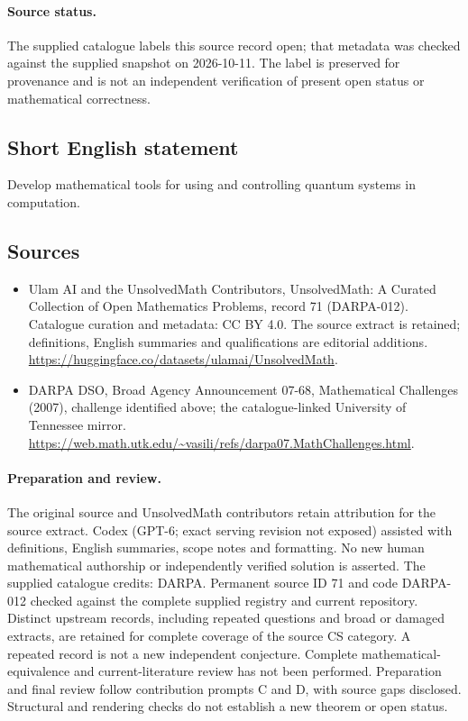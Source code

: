 \documentclass[11pt]{article}
\begin{document}
\paragraph{Source status.}
The supplied catalogue labels this source record open; that metadata was checked against the supplied snapshot on 2026-10-11. The label is preserved for provenance and is not an independent verification of present open status or mathematical correctness.
\subsection{Short English statement}
Develop mathematical tools for using and controlling quantum systems in computation.
\subsection{Sources}
\begin{itemize}
\item[\hypertarget{source:71:1}{S1}] Ulam AI and the UnsolvedMath Contributors, UnsolvedMath: A Curated Collection of Open Mathematics Problems, record 71 (DARPA-012). Catalogue curation and metadata: CC BY 4.0. The source extract is retained; definitions, English summaries and qualifications are editorial additions.
\url{https://huggingface.co/datasets/ulamai/UnsolvedMath}.
\item[\hypertarget{source:71:2}{S2}] DARPA DSO, Broad Agency Announcement 07-68, Mathematical Challenges (2007), challenge identified above; the catalogue-linked University of Tennessee mirror.
\url{https://web.math.utk.edu/~vasili/refs/darpa07.MathChallenges.html}.
\end{itemize}
\paragraph{Preparation and review.}
The original source and UnsolvedMath contributors retain attribution for the source extract. Codex (GPT-6; exact serving revision not exposed) assisted with definitions, English summaries, scope notes and formatting. No new human mathematical authorship or independently verified solution is asserted. The supplied catalogue credits: DARPA. Permanent source ID 71 and code DARPA-012 checked against the complete supplied registry and current repository. Distinct upstream records, including repeated questions and broad or damaged extracts, are retained for complete coverage of the source CS category. A repeated record is not a new independent conjecture. Complete mathematical-equivalence and current-literature review has not been performed. Preparation and final review follow contribution prompts C and D, with source gaps disclosed. Structural and rendering checks do not establish a new theorem or open status.
\label{end:71}
\end{document}
